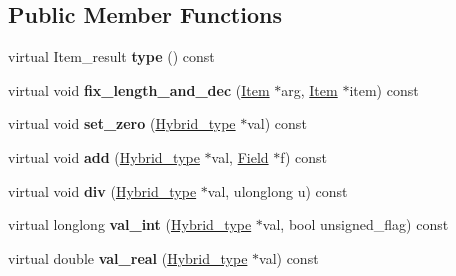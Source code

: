 \subsection*{Public Member Functions}
\begin{DoxyCompactItemize}
\item 
\mbox{\label{structHybrid__type__traits__integer_ab423616eaba8cfdbaa6313e925ac1d8e}} 
virtual Item\+\_\+result {\bfseries type} () const
\item 
\mbox{\label{structHybrid__type__traits__integer_a76a7877ec7cc6a7bfba2643a9390ed48}} 
virtual void {\bfseries fix\+\_\+length\+\_\+and\+\_\+dec} (\mbox{\hyperlink{classItem}{Item}} $\ast$arg, \mbox{\hyperlink{classItem}{Item}} $\ast$item) const
\item 
\mbox{\label{structHybrid__type__traits__integer_ac7f6c8248e1f82808cb375a44e0df07a}} 
virtual void {\bfseries set\+\_\+zero} (\mbox{\hyperlink{structHybrid__type}{Hybrid\+\_\+type}} $\ast$val) const
\item 
\mbox{\label{structHybrid__type__traits__integer_a848c865cfa5c5506c8c7ca0ffb702f78}} 
virtual void {\bfseries add} (\mbox{\hyperlink{structHybrid__type}{Hybrid\+\_\+type}} $\ast$val, \mbox{\hyperlink{classField}{Field}} $\ast$f) const
\item 
\mbox{\label{structHybrid__type__traits__integer_a6f5de09732e06d050559efe87878e7e3}} 
virtual void {\bfseries div} (\mbox{\hyperlink{structHybrid__type}{Hybrid\+\_\+type}} $\ast$val, ulonglong u) const
\item 
\mbox{\label{structHybrid__type__traits__integer_a081dd686b0755cc9178d49c45b33743a}} 
virtual longlong {\bfseries val\+\_\+int} (\mbox{\hyperlink{structHybrid__type}{Hybrid\+\_\+type}} $\ast$val, bool unsigned\+\_\+flag) const
\item 
\mbox{\label{structHybrid__type__traits__integer_a305b094d413d3c774cf28a66b2258083}} 
virtual double {\bfseries val\+\_\+real} (\mbox{\hyperlink{structHybrid__type}{Hybrid\+\_\+type}} $\ast$val) const

\end{DoxyCompactItemize}
